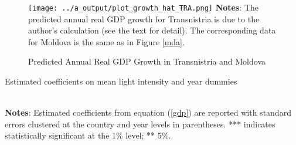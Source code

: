 \documentclass[12pt,a4paper]{article}%
\begin{document}
\begin{figure}[ptb]
\caption{Predicted Annual Real GDP Growth in Transnistria and Moldova}
\texttt{[image: ../a\_output/plot\_growth\_hat\_TRA.png]}
\label{tra}%
{\scriptsize \textbf{Notes}: 
	The predicted annual real GDP growth for Transnistria is due to the author's calculation (see the text for detail).
	The corresponding data for Moldova is the same as in Figure \ref{mda}.
}
\end{figure}

\begin{table}[ptb]
\caption{Estimated coefficients on mean light intensity and year dummies}%
\label{estimates}%
\\
{\scriptsize \textbf{Notes}: 
	Estimated coefficients from equation (\ref{gdp}) are reported with standard errors clustered at the country and year levels in parentheses. *** indicates statistically significant at the 1\% level; ** 5\%.
}
\end{table}
\end{document}
